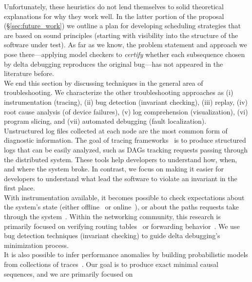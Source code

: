 Unfortunately, these heuristics do not lend themselves to solid theoretical
explanations for why they work well. In the latter portion of the
proposal (\S\ref{sec:future_work}) we outline a plan for
developing scheduling strategies that are based on sound principles (starting
with visibility into the structure of the software under test).
As far as we know, the problem statement and approach we pose there---applying model checkers
to {\em certify} whether each subsequence chosen by delta debugging reproduces
the original bug---has not appeared in the literature before.\\[0.5ex]
%
 We end this section by discussing
techniques in the general area of troubleshooting. We characterize the other troubleshooting approaches
as (i) instrumentation (tracing),
(ii) bug detection (invariant checking),
(iii) replay,
(iv) root cause analysis (of device failures), (v) log comprehension
(visualization), (vi) program slicing, and (vii) automated debugging (fault
localization).\\[0.5ex]
%
 Unstructured
log files collected at each node are the most common form of diagnostic information. The goal of
tracing frameworks~\cite{pip,fonseca2007x,Chen02pinpoint:problem,ndb14,barham2004using}
is to produce structured logs that can be easily analyzed, such as DAGs tracking
requests passing through the distributed system. These tools help developers to understand
how, when, and where the system broke. In contrast, we focus on making it
easier for developers to understand what lead the software
to violate an invariant in the first place.\\[0.5ex]
%
 With instrumentation available, it becomes possible
to check expectations about the
system's state (either offline~\cite{Liu07widschecker} or online~\cite{d3s}), or about the paths requests take through
the system~\cite{pip}. Within the networking community, this research is
primarily focused on verifying routing tables~\cite{hsa,hsa_realtime,anteater,khurshid2012veriflow}
or forwarding behavior~\cite{Zeng:2012:ATP:2413176.2413205,libra}.
We use bug detection techniques (invariant checking) to guide delta debugging's minimization
process.\\[0.5ex]
%
It is also possible to infer
performance anomalies by building probabilistic models from
collections of traces~\cite{barham2004using,Chen02pinpoint:problem}.
Our goal is to produce exact minimal causal sequences, and we are primarily focused on
